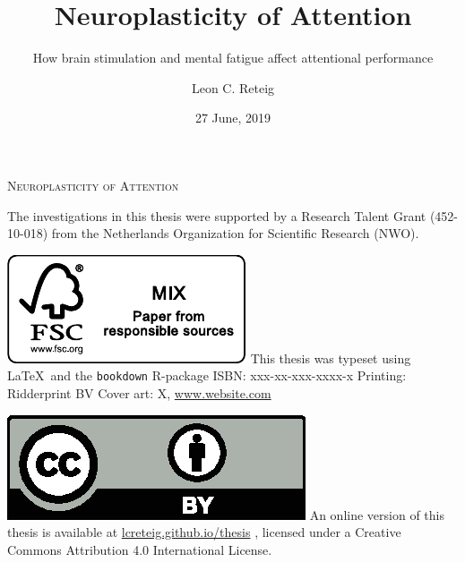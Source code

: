 \documentclass[12pt,a4paper,]{memoir}
\title{Neuroplasticity of Attention}
\subtitle{How brain stimulation and mental fatigue affect attentional performance}
\author{Leon C. Reteig}
\date{27 June, 2019}
\begin{document}
\maketitle


{\pagestyle{empty} 

\def\drop{.1\textheight}
\vspace*{\drop}
\begin{center}
\Huge \textsc{Neuroplasticity of Attention} %
\end{center}

\clearpage
\vspace*{\fill}
\begingroup %
\small
\setlength{\parskip}{\baselineskip} %
\setlength\parindent{0pt} %
The investigations in this thesis were supported by 
a Research Talent Grant (452-10-018)  %
from 
the Netherlands Organization for Scientific Research (NWO). %

\includegraphics{_bookdown_files/FSC.pdf} \newline
This thesis was typeset using \LaTeX\ and the \verb+bookdown+ R-package \newline
ISBN: xxx-xx-xxx-xxxx-x \newline %
Printing: Ridderprint BV \newline %
Cover art: X, \url{www.website.com} %

\includegraphics{_bookdown_files/CC-BY.eps} \newline
An online version of this thesis is available at 
\url{lcreteig.github.io/thesis} %
, licensed under a 
Creative Commons Attribution 4.0 International License. %
\endgroup

}
\end{document}
